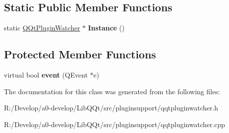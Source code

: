 \subsection*{Static Public Member Functions}
\begin{DoxyCompactItemize}
\item 
\mbox{\label{class_q_qt_plugin_watcher_aa59779393184d45e0add891ee895c41e}} 
static \mbox{\hyperlink{class_q_qt_plugin_watcher}{Q\+Qt\+Plugin\+Watcher}} $\ast$ {\bfseries Instance} ()
\end{DoxyCompactItemize}
\subsection*{Protected Member Functions}
\begin{DoxyCompactItemize}
\item 
\mbox{\label{class_q_qt_plugin_watcher_aafc8a98c6b9da89212156ae1a2f98067}} 
virtual bool {\bfseries event} (Q\+Event $\ast$e)
\end{DoxyCompactItemize}


The documentation for this class was generated from the following files\+:\begin{DoxyCompactItemize}
\item 
R\+:/\+Develop/a0-\/develop/\+Lib\+Q\+Qt/src/pluginsupport/qqtpluginwatcher.\+h\item 
R\+:/\+Develop/a0-\/develop/\+Lib\+Q\+Qt/src/pluginsupport/qqtpluginwatcher.\+cpp\end{DoxyCompactItemize}

